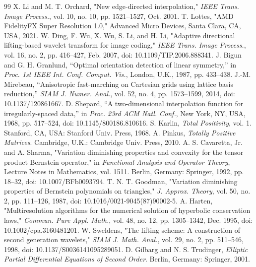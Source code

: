 \documentclass[journal]{IEEEtran}
\begin{document}
\begin{thebibliography}{99}
X. Li and M. T. Orchard, "New edge-directed interpolation," \emph{IEEE
Trans. Image Process.}, vol. 10, no. 10, pp. 1521--1527, Oct. 2001.
T. Lottes, "AMD FidelityFX Super Resolution 1.0," Advanced Micro Devices,
Santa Clara, CA, USA, 2021.
W. Ding, F. Wu, X. Wu, S. Li, and H. Li, "Adaptive directional
lifting-based wavelet transform for image coding," \emph{IEEE Trans. Image
Process.}, vol. 16, no. 2, pp. 416--427, Feb. 2007,
doi: 10.1109/TIP.2006.888341.
J. Bigun and G. H. Granlund, ``Optimal orientation detection of linear
symmetry,'' in \emph{Proc. 1st IEEE Int. Conf. Comput. Vis.}, London, U.K.,
1987, pp. 433--438.
J.-M. Mirebeau, ``Anisotropic fast-marching on Cartesian grids using lattice
basis reduction,'' \emph{SIAM J. Numer. Anal.}, vol. 52, no. 4,
pp. 1573--1599, 2014, doi: 10.1137/120861667.
D. Shepard, ``A two-dimensional interpolation function for irregularly-spaced
data,'' in \emph{Proc. 23rd ACM Natl. Conf.}, New York, NY, USA, 1968,
pp. 517--524, doi: 10.1145/800186.810616.
S. Karlin, \emph{Total Positivity}, vol. 1. Stanford, CA, USA: Stanford
Univ. Press, 1968.
A. Pinkus, \emph{Totally Positive Matrices}. Cambridge, U.K.: Cambridge
Univ. Press, 2010.
A. S. Cavaretta, Jr. and A. Sharma, "Variation diminishing properties and
convexity for the tensor product Bernstein operator," in \emph{Functional
Analysis and Operator Theory}, Lecture Notes in Mathematics, vol. 1511.
Berlin, Germany: Springer, 1992, pp. 18--32,
doi: 10.1007/BFb0093794.
T. N. T. Goodman, "Variation diminishing properties of Bernstein
polynomials on triangles," \emph{J. Approx. Theory}, vol. 50, no. 2,
pp. 111--126, 1987, doi: 10.1016/0021-9045(87)90002-5.
A. Harten, "Multiresolution algorithms for the numerical solution of
hyperbolic conservation laws," \emph{Commun. Pure Appl. Math.}, vol. 48,
no. 12, pp. 1305--1342, Dec. 1995,
doi: 10.1002/cpa.3160481201.
W. Sweldens, "The lifting scheme: A construction of second generation
wavelets," \emph{SIAM J. Math. Anal.}, vol. 29, no. 2, pp. 511--546, 1998,
doi: 10.1137/S0036141095289051.
D. Gilbarg and N. S. Trudinger, \emph{Elliptic Partial Differential Equations
of Second Order}. Berlin, Germany: Springer, 2001.
\end{thebibliography}
\end{document}
